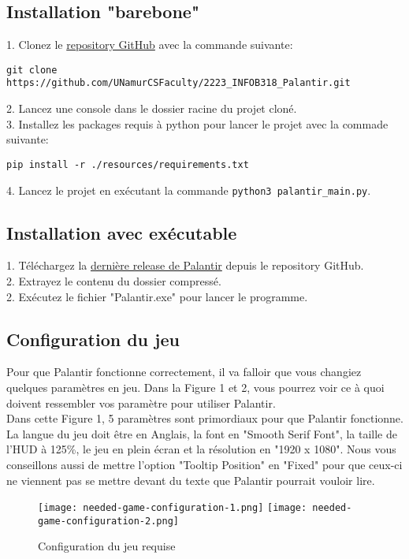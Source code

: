\subsection{Installation "barebone"}
1. Clonez le \href{https://github.com/UNamurCSFaculty/2223_INFOB318_Palantir}{repository GitHub} avec la commande suivante:
\begin{verbatim}
git clone https://github.com/UNamurCSFaculty/2223_INFOB318_Palantir.git
\end{verbatim}
2. Lancez une console dans le dossier racine du projet cloné.\\
3. Installez les packages requis à python pour lancer le projet avec la commade suivante:
\begin{verbatim}
pip install -r ./resources/requirements.txt
\end{verbatim}
4. Lancez le projet en exécutant la commande {\renewcommand{\fcolorbox}[4][]{#4}\texttt{python3 palantir_main.py}}.

\subsection{Installation avec exécutable}
1. Téléchargez la \href{https://github.com/UNamurCSFaculty/2223_INFOB318_Palantir/releases}{dernière release de Palantir} depuis le repository GitHub.\\
2. Extrayez le contenu du dossier compressé.\\
2. Exécutez le fichier "Palantir.exe" pour lancer le programme.

\newpage

\subsection{Configuration du jeu}
Pour que Palantir fonctionne correctement, il va falloir que vous changiez quelques paramètres en jeu. Dans la Figure 1 et 2, vous pourrez voir ce à quoi doivent ressembler vos paramètre pour utiliser Palantir.\\

Dans cette Figure 1, 5 paramètres sont primordiaux pour que Palantir fonctionne. La langue du jeu doit être en Anglais, la font en "Smooth Serif Font", la taille de l'HUD à 125\%, le jeu en plein écran et la résolution en "1920 x 1080". Nous vous conseillons aussi de mettre l'option "Tooltip Position" en "Fixed" pour que ceux-ci ne viennent pas se mettre devant du texte que Palantir pourrait vouloir lire.
\begin{figure}[ht!]
    \begin{center}
        \texttt{[image: needed-game-configuration-1.png]}
        \texttt{[image: needed-game-configuration-2.png]}
    \end{center}
    \caption{Configuration du jeu requise}
\end{figure}